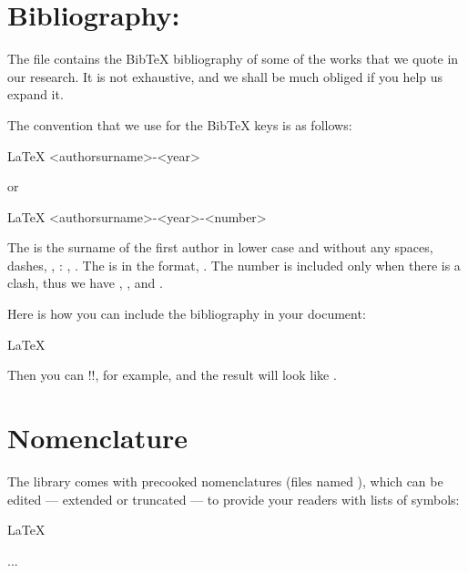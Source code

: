 {{\section{Bibliography: }

The file  contains the BibTeX bibliography of some of the works that we quote in our research. It is not exhaustive, and we shall be much obliged if you help us expand it.

The convention that we use for the BibTeX keys is as follows:
\begin{snippet}{LaTeX}
<authorsurname>-<year>
\end{snippet}
or
\begin{snippet}{LaTeX}
<authorsurname>-<year>-<number>
\end{snippet}
The  is the surname of the first author in lower case and without any spaces, dashes, \etc, \eg: , . The  is in the  format, . The number is included only when there is a clash, thus we have , , and .

Here is how you can include the bibliography in your document:
\begin{snippet}{LaTeX}


\end{snippet}

Then you can \code!\cite{edalat-1998}!, for example, and the result will look like \cite{edalat-1998}.

\section{Nomenclature}

The library comes with precooked nomenclatures (files named ), which can be edited --- extended or truncated --- to provide your readers with lists of symbols:
\begin{snippet}{LaTeX}
\makenomenclature



...




\printnomenclature


\end{snippet}

}}
